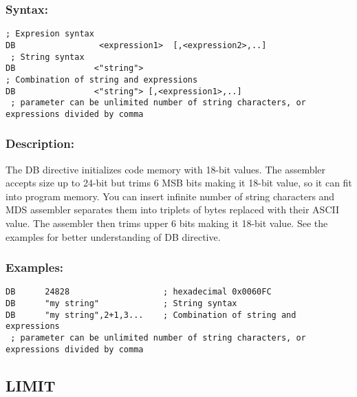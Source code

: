         \subsubsection{Syntax:}
            {
                \usecodefont
                \verb '; Expresion syntax'\\
                \verb'DB                 <expression1>  [,<expression2>,..]'\\
                \verb' ; String syntax'\\
                \verb'DB                <"string">'\\
                \verb'; Combination of string and expressions'\\
                \verb'DB                <"string"> [,<expression1>,..]'\\
                \verb' ; parameter can be unlimited number of string characters, or expressions divided by comma'\\
            }

        \subsubsection{Description:}
            The DB directive initializes code memory with 18-bit values. The assembler accepts size up to 24-bit but trims 6 MSB bits making it 18-bit value,
            so it can fit into program memory. You can insert infinite number of string characters and MDS assembler separates them into triplets of bytes replaced
            with their ASCII value. The assembler then trims upper 6 bits making it 18-bit value.
            See the examples for better understanding of DB directive.

        \subsubsection{Examples:}
        {
            \usecodefont
            \verb'DB      24828                   ; hexadecimal 0x0060FC'\\
            \verb'DB      "my string"             ; String syntax'\\
            \verb'DB      "my string",2+1,3...    ; Combination of string and expressions'\\
            \verb' ; parameter can be unlimited number of string characters, or expressions divided by comma'\\
        }
    \subsection{LIMIT}

